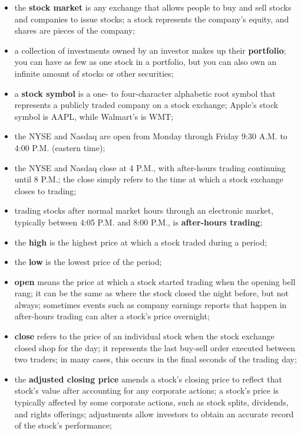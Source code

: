 \begin{itemize}
    \item the \textbf{stock market} is any exchange that allows people to buy 
and sell stocks and companies to issue stocks; a stock represents the company's 
equity, and shares are pieces of the company;
    \item a collection of investments owned by an investor makes up their  
\textbf{portfolio}; you can have as few as one stock in a portfolio, but you 
can also own an infinite amount of stocks or other securities;
    \item a \textbf{stock symbol} is a one- to four-character alphabetic root 
symbol that represents a publicly traded company on a stock exchange; Apple's 
stock symbol is AAPL, while Walmart's is WMT;
    \item the NYSE and Nasdaq are open from Monday through Friday 9:30 A.M. to 
4:00 P.M. (eastern time);
    \item the NYSE and Nasdaq close at 4 P.M., with after-hours trading 
continuing until 8 P.M.; the close simply refers to the time at which a stock 
exchange closes to trading;
    \item trading stocks after normal market hours through an electronic market, 
typically between 4:05 P.M. and 8:00 P.M., is \textbf{after-hours trading};
    \item the \textbf{high} is the highest price at which a stock traded during 
a period;
    \item the \textbf{low} is the lowest price of the period;
    \item \textbf{open} means the price at which a stock started trading when 
the opening bell rang; it can be the same as where the stock closed the night 
before, but not always; sometimes events such as company earnings reports that 
happen in after-hours trading can alter a stock’s price overnight;
    \item \textbf{close} refers to the price of an individual stock when the 
stock exchange closed shop for the day; it represents the last buy-sell order 
executed between two traders; in many cases, this occurs in the final seconds of 
the trading day;
    \item the \textbf{adjusted closing price} amends a stock's closing price to 
reflect that stock's value after accounting for any corporate actions; a 
stock's price is typically affected by some corporate actions, such as 
stock splits, dividends, and rights offerings; adjustments allow investors to 
obtain an accurate record of the stock's performance;

\end{itemize}
